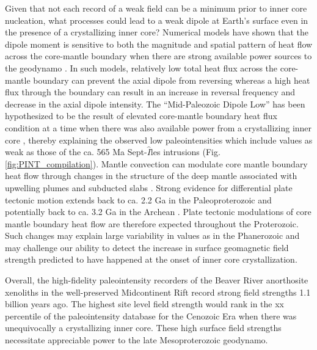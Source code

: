 \documentclass[9pt,twocolumn,twoside,lineno]{pnas-new}
\begin{document}
Given that not each record of a weak field can be a minimum prior to inner core nucleation, what processes could lead to a weak dipole at Earth's surface even in the presence of a crystallizing inner core? Numerical models have shown that the dipole moment is sensitive to both the magnitude and spatial pattern of heat flow across the core-mantle boundary when there are strong available power sources to the geodynamo \cite{Olson2007a, Olson2010a}. In such models, relatively low total heat flux across the core-mantle boundary can prevent the axial dipole from reversing whereas a high heat flux through the boundary can result in an increase in reversal frequency and decrease in the axial dipole intensity. The ``Mid-Paleozoic Dipole Low'' has been hypothesized to be the result of elevated core-mantle boundary heat flux condition at a time when there was also available power from a crystallizing inner core \cite{Hawkins2019a}, thereby explaining the observed low paleointensities which include values as weak as those of the ca. 565 Ma Sept-$\hat{I}$les intrusions \cite{Bono2019a} (Fig. \ref{fig:PINT_compilation}). Mantle convection can modulate core mantle boundary heat flow through changes in the structure of the deep mantle associated with upwelling plumes \cite{Larson1991a, Courtillot2007a} and subducted slabs \cite{Tan2002b, Biggin2012a, Hounslow2018a}. Strong evidence for differential plate tectonic motion extends back to ca. 2.2 Ga in the Paleoproterozoic \cite{Mitchell2014a,Swanson-Hysell2021b} and potentially back to ca. 3.2 Ga in the Archean \cite{Brenner2020a}. Plate tectonic modulations of core mantle boundary heat flow are therefore expected throughout the Proterozoic. Such changes may explain large variability in values as in the Phanerozoic \cite{Lloyd2021a} and may challenge our ability to detect the increase in surface geomagnetic field strength predicted to have happened at the onset of inner core crystallization. 

Overall, the high-fidelity paleointensity recorders of the Beaver River anorthosite xenoliths in the well-preserved Midcontinent Rift record strong field strengths 1.1 billion years ago. The highest site level field strength would rank in the xx percentile of the paleointensity database for the Cenozoic Era when there was unequivocally a crystallizing inner core. These high surface field strengths necessitate appreciable power to the late Mesoproterozoic geodynamo. 

\end{document}
